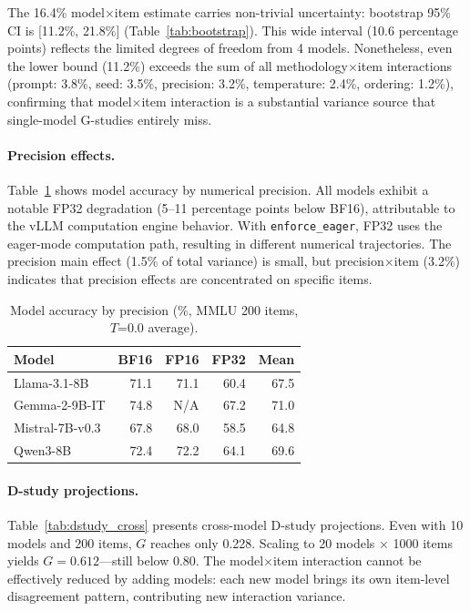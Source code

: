 \documentclass[11pt,letterpaper]{article}
\begin{document}
The 16.4\% model$\times$item estimate carries non-trivial uncertainty: bootstrap 95\% CI is [11.2\%, 21.8\%] (Table~\ref{tab:bootstrap}).
This wide interval (10.6 percentage points) reflects the limited degrees of freedom from 4 models.
Nonetheless, even the lower bound (11.2\%) exceeds the sum of all methodology$\times$item interactions (prompt: 3.8\%, seed: 3.5\%, precision: 3.2\%, temperature: 2.4\%, ordering: 1.2\%), confirming that model$\times$item interaction is a substantial variance source that single-model G-studies entirely miss.

\paragraph{Precision effects.}
Table~\ref{tab:precision} shows model accuracy by numerical precision.
All models exhibit a notable FP32 degradation (5--11 percentage points below BF16), attributable to the vLLM computation engine behavior.
With \texttt{enforce\_eager}, FP32 uses the eager-mode computation path, resulting in different numerical trajectories.
The precision main effect (1.5\% of total variance) is small, but precision$\times$item (3.2\%) indicates that precision effects are concentrated on specific items.

\begin{table}[t]
\centering
\caption{Model accuracy by precision (\%, MMLU 200 items, $T$=0.0 average).}
\label{tab:precision}
\small
\begin{tabular}{@{}lrrrr@{}}
\toprule
Model & BF16 & FP16 & FP32 & Mean \\
\midrule
Llama-3.1-8B & 71.1 & 71.1 & 60.4 & 67.5 \\
Gemma-2-9B-IT & 74.8 & N/A & 67.2 & 71.0 \\
Mistral-7B-v0.3 & 67.8 & 68.0 & 58.5 & 64.8 \\
Qwen3-8B & 72.4 & 72.2 & 64.1 & 69.6 \\
\bottomrule
\end{tabular}
\end{table}

\paragraph{D-study projections.}
Table~\ref{tab:dstudy_cross} presents cross-model D-study projections.
Even with 10 models and 200 items, $G$ reaches only 0.228.
Scaling to 20 models $\times$ 1000 items yields $G = 0.612$---still below 0.80.
The model$\times$item interaction cannot be effectively reduced by adding models: each new model brings its own item-level disagreement pattern, contributing new interaction variance.
\end{document}
